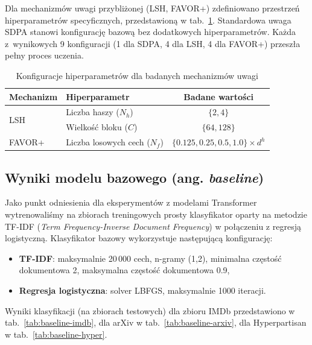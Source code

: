 \documentclass[a4paper,11pt,twoside]{report}
\theoremstyle{definition}
\begin{document}
Dla mechanizmów uwagi przybliżonej (LSH, FAVOR+) zdefiniowano przestrzeń hiperparametrów specyficznych, przedstawioną w tab.~\ref{tab:attention-hyperparams-configs}. Standardowa uwaga SDPA stanowi konfigurację bazową bez dodatkowych hiperparametrów. Każda z~wynikowych 9 konfiguracji (1 dla SDPA, 4 dla LSH, 4 dla FAVOR+) przeszła pełny proces uczenia.

\begin{table}[t!]
\centering
\caption{Konfiguracje hiperparametrów dla badanych mechanizmów uwagi}
\label{tab:attention-hyperparams-configs}
\smallskip
\small
\begin{tabular}{@{}llc@{}}
\toprule
\textbf{Mechanizm} & \textbf{Hiperparametr} & \textbf{Badane wartości} \\
\midrule
\multirow{2}{*}{LSH} 
    & Liczba haszy ($N_h$)  & $\{2, 4\}$ \\
    & Wielkość bloku ($C$)     & $\{64, 128\}$ \\
\midrule
FAVOR+
    & Liczba losowych cech ($N_f$) & $\{0.125, 0.25, 0.5, 1.0\} \times d^h$ \\
\bottomrule
\end{tabular}
\end{table}





\subsection{Wyniki modelu bazowego (ang. \emph{baseline})}

Jako punkt odniesienia dla eksperymentów z modelami Transformer wytrenowaliśmy na zbiorach treningowych prosty klasyfikator oparty na metodzie TF-IDF (\emph{Term Frequency-Inverse Document Frequency}) w połączeniu z regresją logistyczną.
Klasyfikator bazowy wykorzystuje następującą konfigurację:
\begin{itemize}
    \item \textbf{TF-IDF}: maksymalnie 20\,000 cech, n-gramy (1,2), minimalna częstość dokumentowa 2, maksymalna częstość dokumentowa 0.9,
    \item \textbf{Regresja logistyczna}: solver LBFGS, maksymalnie 1000 iteracji.
\end{itemize}

Wyniki klasyfikacji (na zbiorach testowych) dla zbioru IMDb przedstawiono w tab.~\ref{tab:baseline-imdb}, dla arXiv w tab.~\ref{tab:baseline-arxiv}, dla Hyperpartisan w tab.~\ref{tab:baseline-hyper}.
\end{document}
